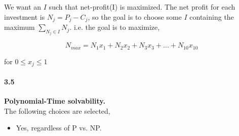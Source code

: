 \documentclass{article}
\begin{document}
\noindent
We want an $I$ such that net-profit(I) is maximized. The net profit for each investment is $N_j = P_j - C_j$, so the goal is to choose some
$I$ containing the maximum $\sum_{N_j \in I} N_j$.
i.e. the goal is to maximize,

$$N_{max} = N_1x_1 + N_2x_2 + N_3x_3 + ... + N_{10}x_{10}$$

for $0 \leq x_j \leq 1$

\paragraph*{3.5} \textbf{Polynomial-Time solvability.} \\


\noindent
The following choices are selected,

\begin{itemize}
\item Yes, regardless of P vs. NP.
\end{itemize}
\end{document}
